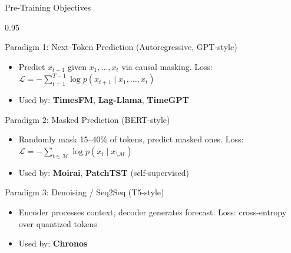 \documentclass[9pt, aspectratio=169, t]{beamer}
\begin{document}
\begin{frame}{Pre-Training Objectives}
    \begin{cminipage}{0.95\textwidth}
    \vspace{-3mm}
    {\scriptsize
    \begin{block}{Paradigm 1: Next-Token Prediction (Autoregressive, GPT-style)}
        \vspace{-1mm}
        \begin{itemize}\setlength{\itemsep}{0pt}
            \item Predict $x_{t+1}$ given $x_1, \ldots, x_t$ via causal masking. Loss: $\mathcal{L} = -\sum_{t=1}^{T-1} \log p(x_{t+1} \mid x_1, \ldots, x_t)$
            \item Used by: \textbf{TimesFM}, \textbf{Lag-Llama}, \textbf{TimeGPT}
        \end{itemize}
        \vspace{-1mm}
    \end{block}
    \vspace{-2.5mm}
    \begin{alertblock}{Paradigm 2: Masked Prediction (BERT-style)}
        \vspace{-1mm}
        \begin{itemize}\setlength{\itemsep}{0pt}
            \item Randomly mask 15--40\% of tokens, predict masked ones. Loss: $\mathcal{L} = -\sum_{t \in \mathcal{M}} \log p(x_t \mid x_{\setminus \mathcal{M}})$
            \item Used by: \textbf{Moirai}, \textbf{PatchTST} (self-supervised)
        \end{itemize}
        \vspace{-1mm}
    \end{alertblock}
    \vspace{-2.5mm}
    \begin{exampleblock}{Paradigm 3: Denoising / Seq2Seq (T5-style)}
        \vspace{-1mm}
        \begin{itemize}\setlength{\itemsep}{0pt}
            \item Encoder processes context, decoder generates forecast. Loss: cross-entropy over quantized tokens
            \item Used by: \textbf{Chronos}
        \end{itemize}
        \vspace{-1mm}
    \end{exampleblock}
    }
    \end{cminipage}
\end{frame}
\end{document}
